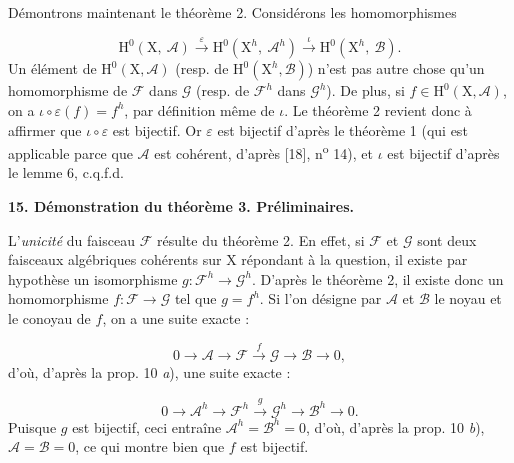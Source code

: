 
Démontrons maintenant le théorème 2. Considérons les homomorphismes

\begin{equation*}
\mathrm{H}^0(\mathrm{X},\ \mathcal{A}) \xrightarrow{\varepsilon} \mathrm{H}^0(\mathrm{X}^h,\ \mathcal{A}^h) \xrightarrow{\iota} \mathrm{H}^0(\mathrm{X}^h,\ \mathcal{B}).
\end{equation*}
Un élément de $\mathrm{H}^0(\mathrm{X}, \mathcal{A})$ (resp. de $\mathrm{H}^0(\mathrm{X}^h, \mathcal{B})$) n'est pas autre chose qu'un homomorphisme de $\mathcal{F}$ dans $\mathcal{G}$ (resp. de $\mathcal{F}^h$ dans $\mathcal{G}^h$). De plus, si $f \in \mathrm{H}^0(\mathrm{X}, \mathcal{A})$, on a $\iota \circ \varepsilon(f) = f^h$, par définition même de $\iota$. Le théorème 2 revient donc à affirmer que $\iota \circ \varepsilon$ est bijectif. Or $\varepsilon$ est bijectif d'après le théorème 1 (qui est applicable parce que $\mathcal{A}$ est cohérent, d'après [18], n\textsuperscript{o} 14), et $\iota$ est bijectif d'après le lemme 6, c.q.f.d.


\textbf{15. Démonstration du théorème 3. Préliminaires.}

L'\textit{unicité} du faisceau $\mathcal{F}$ résulte du théorème 2. En effet, si $\mathcal{F}$ et $\mathcal{G}$ sont deux faisceaux algébriques cohérents sur $\mathrm{X}$ répondant à la question, il existe par hypothèse un isomorphisme $g : \mathcal{F}^h \to \mathcal{G}^h$. D'après le théorème 2, il existe donc un homomorphisme $f : \mathcal{F} \to \mathcal{G}$ tel que $g = f^h$. Si l'on désigne par $\mathcal{A}$ et $\mathcal{B}$ le noyau et le conoyau de $f$, on a une suite exacte :

\begin{equation*}
0 \to \mathcal{A} \to \mathcal{F} \xrightarrow{f} \mathcal{G} \to \mathcal{B} \to 0,
\end{equation*}
d'où, d'après la prop. 10 \textit{a}), une suite exacte :

\begin{equation*}
0 \to \mathcal{A}^h \to \mathcal{F}^h \xrightarrow{g} \mathcal{G}^h \to \mathcal{B}^h \to 0.
\end{equation*}
Puisque $g$ est bijectif, ceci entraîne $\mathcal{A}^h = \mathcal{B}^h = 0$, d'où, d'après la prop. 10 \textit{b}), $\mathcal{A} = \mathcal{B} = 0$, ce qui montre bien que $f$ est bijectif.

